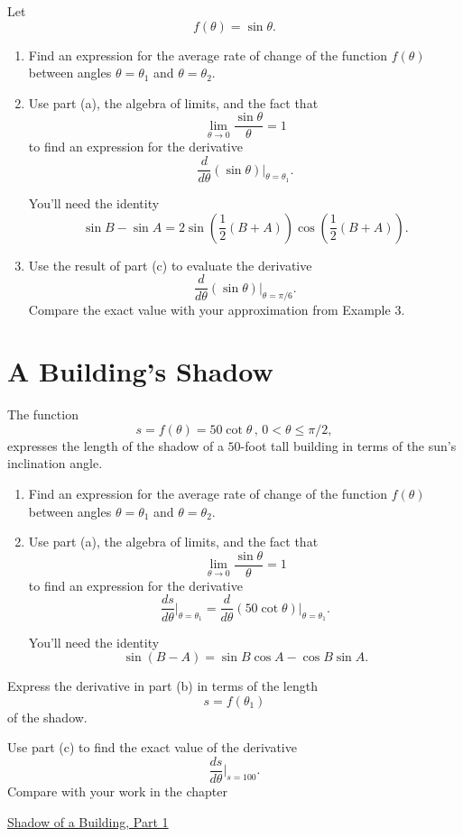 \documentclass{ximera}
\begin{document}
\begin{example}
Let 
\[
   f(\theta) = \sin\theta .
\]

\begin{enumerate}
\item Find an expression for the average rate of change of the function $f(\theta)$ between angles $\theta = \theta_1$ and $\theta = \theta_2$.

\item Use part (a), the algebra of limits, and the fact that
\[
  \lim_{\theta\to 0} \frac{\sin\theta}{\theta} = 1
\]
to find an expression for the derivative
\[
   \frac{d}{d\theta} \left( \sin \theta \right)\Big|_{\theta = \theta_1} .
\]

You'll need the identity
\[
   \sin B - \sin A = 2\sin\left( \frac{1}{2} \left( B+A  \right)\right) \cos\left( \frac{1}{2} \left( B+A  \right)\right) .
\]

\item Use the result of part (c) to evaluate the derivative
\[
 \frac{d}{d\theta} \left( \sin \theta \right)\Big|_{\theta =\pi/6 } .
\]
Compare the exact value with your approximation from Example 3.
\end{enumerate}

\end{example}


\section{A Building's Shadow}

\begin{example} \label{ExLfm3209}
The function
\[
   s = f(\theta) = 50\cot \theta \, , \, 0<\theta\leq \pi/2 ,
\]
expresses the length of the shadow of a $50$-foot tall building in terms of the sun's inclination angle.

\begin{enumerate}
\item Find  an expression for the average rate of change of the function $f(\theta)$ between angles $\theta = \theta_1$ and $\theta = \theta_2$.

\item  Use part (a), the algebra of limits, and the fact that
\[
  \lim_{\theta\to 0} \frac{\sin\theta}{\theta} = 1
\]
to find an expression for the derivative
\[
    \frac{ds}{d\theta} \Big|_{\theta = \theta_1} =   \frac{d}{d\theta} \left( 50 \cot \theta \right)\Big|_{\theta = \theta_1} .
\]

You'll need the identity
\[
   \sin(B-A) = \sin B \cos A - \cos B \sin A.
\]
\end{enumerate}

\item Express the derivative in part (b) in terms of the length
\[
  s = f(\theta_1) 
\]
of the shadow.

\item Use part (c) to find the exact value of the derivative
\[
   \frac{ds}{d\theta} \Big|_{s=100} .
\]
Compare with your work in the chapter

\href{https://ximera.osu.edu/calcone/Calculus1/Shadow1/Shadow1}{Shadow of a Building, Part 1}

\end{example}
\end{document}
